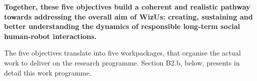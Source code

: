 \documentclass[11pt,a4paper]{report}
\newcommand{\project}{WizUs\xspace}
\begin{document}
\begin{framed}

\noindent\bf Together, these five objectives build a coherent and realistic pathway towards
addressing the overall aim of \project: creating, sustaining and better
understanding the dynamics of responsible long-term social human-robot
interactions.

\end{framed}

The five objectives translate into five workpackages, that organise the actual
work to deliver on the research programme. Section B2.b, below, presents in
detail this work programme.

%
%
%
\end{document}
